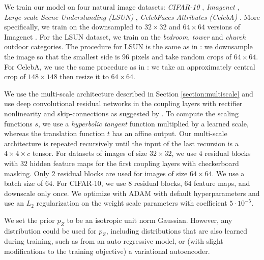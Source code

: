 \documentclass{article}
\begin{document}
We train our model on four natural image datasets: \emph{CIFAR-10} \citep{krizhevsky2009learning}, \emph{Imagenet} \citep{russakovsky2015imagenet}, \emph{Large-scale Scene Understanding (LSUN)} \citep{yu2015construction}, \emph{CelebFaces Attributes (CelebA)} \citep{liu2015faceattributes}. More specifically, we train on the downsampled to $32 \times 32$ and $64 \times64$ versions of Imagenet \citep{oord2016pixel}. For the LSUN dataset, we train on the \emph{bedroom}, \emph{tower} and \emph{church} outdoor categories. The procedure for LSUN is the same as in \citep{DBLP:journals/corr/RadfordMC15}: we downsample the image so that the smallest side is $96$ pixels and take random crops of $64 \times64$. For CelebA, we use the same procedure as in \citep{DBLP:journals/corr/LarsenSW15}: we take an approximately central crop of $148 \times 148$ then resize it to $64 \times 64$.

We use the multi-scale architecture described in Section \ref{section:multiscale} and use deep convolutional residual networks in the coupling layers with rectifier nonlinearity and skip-connections as suggested by \citep{oord2016pixel}. To compute the scaling functions $s$, we use a {\em hyperbolic tangent} function multiplied by a learned scale, whereas the translation function $t$ has an affine output. Our multi-scale architecture is repeated recursively until the input of the last recursion is a $4 \times 4 \times c$ tensor. For datasets of images of size $32 \times 32$, we use $4$ residual blocks with $32$ hidden feature maps for the first coupling layers with checkerboard masking. Only $2$ residual blocks are used for images of size $64 \times 64$. We use a batch size of $64$. For CIFAR-10, we use $8$ residual blocks, $64$ feature maps, and downscale only once. We optimize with ADAM \citep{kingma2014adam} with default hyperparameters and use an $L_{2}$ regularization on the weight scale parameters with coefficient $5 \cdot 10^{-5}$.

We set the prior $p_{Z}$ to be an isotropic unit norm Gaussian. However, any distribution could be used for $p_{Z}$, including distributions that are also learned during training, such as from an auto-regressive model, or (with slight modifications to the training objective) a variational autoencoder.
\end{document}
